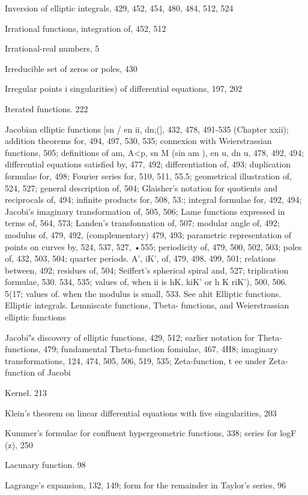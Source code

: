 Inversion of elliptic integrals, 429, 452, 454, 480, 484, 512, 524

Irrational functions, integration of, 452, 512

Irrational-real numbers, 5

%
%

Irreducible set of zeros or poles, 430

Irregular points i singularities) of differential equations, 197, 202

Iterated functions. 222

Jacobian elliptic functions [sn /  en ii, dn;(], 432, 478, 491-535 (Chapter xxii); addition theorems
for, 494, 497, 530, 535; connexion with Weierstrassian functions, 505; definitions of am,
A<p, sn M (sin am  ), en u, dn u, 478, 492, 494; differential equations satisfied by, 477, 492;
differentiation of, 493; duplication formulae for, 498; Fourier series for, 510, 511, 55.5;
geometrical illustration of, 524, 527; general description of, 504; Glaisher's notation for
quotients and reciprocals of, 494; infinite products for, 508, 53:; integral formulae for, 492,
494; Jacobi's imaginary transformation of, 505, 506; Lame functions expressed in terms of,
564, 573; Landen's transfonnation of, 507; modular angle of, 492; modulus of, 479, 492,
(complementary) 479, 493; parametric representation of points on curves by, 524, 537, 527,
•555; periodicity of, 479, 500, 502, 503; poles of, 432, 503, 504; quarter periods. A', iK', of,
479, 498, 499, 501; relations between, 492; residues of, 504; Seiffert's spherical spiral and,
527; triplication formulae, 530. 534, 535; values of, when ii is hK, kiK' or h  K riK'), 500,
506. 5(17; values of. when the modulus is small, 533. See ahit Elliptic functions. Elliptic
integrals. Lemniscate functions, Tbeta- functions, and Weierstrassian elliptic functions

Jacobi"s discovery of elliptic functions, 429, 512; earlier notation for Theta-functions, 479;
fundamental Theta-function fomiulae, 467, 4H8; imaginary transformations, 124, 474, 505,
506, 519, 535; Zeta-function, t ee under Zeta-function of Jacobi

Kernel. 213

Klein's theorem on linear differential equations with five singularities, 203

Kummer's formulae for confluent hypergeometric functions, 338; series for logF (z), 250

Lacunary function. 98

Lagrange's expansion, 132, 149; form for the remainder in Taylor's series, 96

